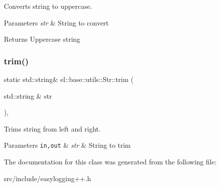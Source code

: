 Converts string to uppercase. 


\begin{DoxyParams}{Parameters}
{\em str} & String to convert \\
\hline
\end{DoxyParams}
\begin{DoxyReturn}{Returns}
Uppercase string 
\end{DoxyReturn}
\mbox{\label{classel_1_1base_1_1utils_1_1_str_aba0bc132c410fd3c1e128d1038e996ba}} 
\subsubsection{\texorpdfstring{trim()}{trim()}}
{\footnotesize\ttfamily static std\+::string\& el\+::base\+::utils\+::\+Str\+::trim (\begin{DoxyParamCaption}\item[{std\+::string \&}]{str }\end{DoxyParamCaption})\hspace{0.3cm}{\ttfamily [inline]}, {\ttfamily [static]}}



Trims string from left and right. 


\begin{DoxyParams}[1]{Parameters}
\mbox{\tt in,out}  & {\em str} & String to trim \\
\hline
\end{DoxyParams}


The documentation for this class was generated from the following file\+:\begin{DoxyCompactItemize}
\item 
src/include/easylogging++.\+h\end{DoxyCompactItemize}
